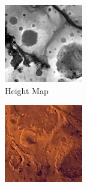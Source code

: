 \documentclass[conf]{new-aiaa}
\begin{document}
\begin{figure}[!t]
	\centering
	\begin{subfigure}[t]{0.3\columnwidth}
           	\centering
          	\includegraphics[height=0.9\textwidth]{mars_heightmap.png}
        		\caption{Height Map}
    	\end{subfigure}
    	\begin{subfigure}[t]{0.3\columnwidth}
           	\centering
          	\includegraphics[height=0.9\textwidth]{mars_colormap.png}

\end{subfigure}
\end{figure}
\end{document}
